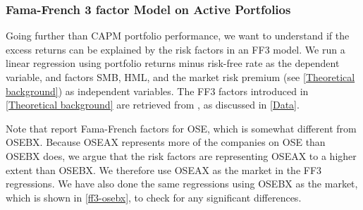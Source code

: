 \subsubsection{Fama-French 3 factor Model on Active Portfolios}

Going further than CAPM portfolio performance, we want to understand if the excess returns can be explained by the risk factors in an FF3 model. We run a linear regression using portfolio returns minus risk-free rate as the dependent variable, and factors SMB, HML, and the market risk premium (see \autoref{Theoretical background}) as independent variables. The FF3 factors introduced in \autoref{Theoretical background} are retrieved from \textcite{bernt-fama-french}, as discussed in \autoref{Data}. 

Note that \textcite{bernt-fama-french} report Fama-French factors for OSE, which is somewhat different from OSEBX. Because OSEAX represents more of the companies on OSE than OSEBX does, we argue that the risk factors are representing OSEAX to a higher extent than OSEBX. We therefore use OSEAX as the market in the FF3 regressions. We have also done the same regressions using OSEBX as the market, which is shown in \autoref{ff3-osebx}, to check for any significant differences.



